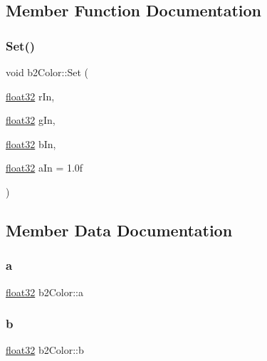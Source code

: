 \subsection{Member Function Documentation}
\mbox{\label{structb2_color_aecd71c7fe34182071a5e4699c4fd5cae}} 
\subsubsection{\texorpdfstring{Set()}{Set()}}
{\footnotesize\ttfamily void b2\+Color\+::\+Set (\begin{DoxyParamCaption}\item[{\mbox{\hyperlink{b2_settings_8h_aacdc525d6f7bddb3ae95d5c311bd06a1}{float32}}}]{r\+In,  }\item[{\mbox{\hyperlink{b2_settings_8h_aacdc525d6f7bddb3ae95d5c311bd06a1}{float32}}}]{g\+In,  }\item[{\mbox{\hyperlink{b2_settings_8h_aacdc525d6f7bddb3ae95d5c311bd06a1}{float32}}}]{b\+In,  }\item[{\mbox{\hyperlink{b2_settings_8h_aacdc525d6f7bddb3ae95d5c311bd06a1}{float32}}}]{a\+In = {\ttfamily 1.0f} }\end{DoxyParamCaption})\hspace{0.3cm}{\ttfamily [inline]}}



\subsection{Member Data Documentation}
\mbox{\label{structb2_color_adf752d6bc4b05221be1d964e47cf716d}} 
\subsubsection{\texorpdfstring{a}{a}}
{\footnotesize\ttfamily \mbox{\hyperlink{b2_settings_8h_aacdc525d6f7bddb3ae95d5c311bd06a1}{float32}} b2\+Color\+::a}

\mbox{\label{structb2_color_a9e7380d27a63010cfad49b97f66dcd26}} 
\subsubsection{\texorpdfstring{b}{b}}
{\footnotesize\ttfamily \mbox{\hyperlink{b2_settings_8h_aacdc525d6f7bddb3ae95d5c311bd06a1}{float32}} b2\+Color\+::b}

